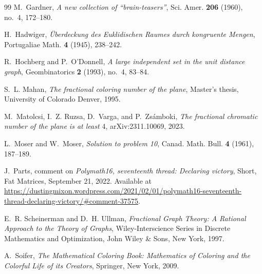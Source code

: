 \documentclass[pdflatex,sn-mathphys-num]{sn-jnl}%
\begin{document}
\begin{thebibliography}{99}
M.~Gardner,
\emph{A new collection of ``brain-teasers''},
Sci. Amer. \textbf{206} (1960), no.~4, 172--180.

H.~Hadwiger,
\emph{{\"U}berdeckung des Euklidischen Raumes durch kongruente Mengen},
Portugaliae Math. \textbf{4} (1945), 238--242.

R.~Hochberg and P.~O'Donnell,
\emph{A large independent set in the unit distance graph},
Geombinatorics \textbf{2} (1993), no.~4, 83--84.

S.~L. Mahan,
\emph{The fractional coloring number of the plane},
Master's thesis, University of Colorado Denver, 1995.

M.~Matolcsi, I.~Z. Ruzsa, D.~Varga, and P.~Zs{\'a}mboki,
\emph{The fractional chromatic number of the plane is at least $4$},
arXiv:2311.10069, 2023.

L.~Moser and W.~Moser,
\emph{Solution to problem 10},
Canad. Math. Bull. \textbf{4} (1961), 187--189.

J.~Parts,
comment on \emph{Polymath16, seventeenth thread: Declaring victory},
Short, Fat Matrices, September 21, 2022.
Available at
\url{https://dustingmixon.wordpress.com/2021/02/01/polymath16-seventeenth-thread-declaring-victory/#comment-37575}.

E.~R. Scheinerman and D.~H. Ullman,
\emph{Fractional Graph Theory: A Rational Approach to the Theory of Graphs},
Wiley-Interscience Series in Discrete Mathematics and Optimization,
John Wiley \& Sons, New York, 1997.

A.~Soifer,
\emph{The Mathematical Coloring Book: Mathematics of Coloring and the Colorful Life of its Creators},
Springer, New York, 2009.

\end{thebibliography}
\end{document}
